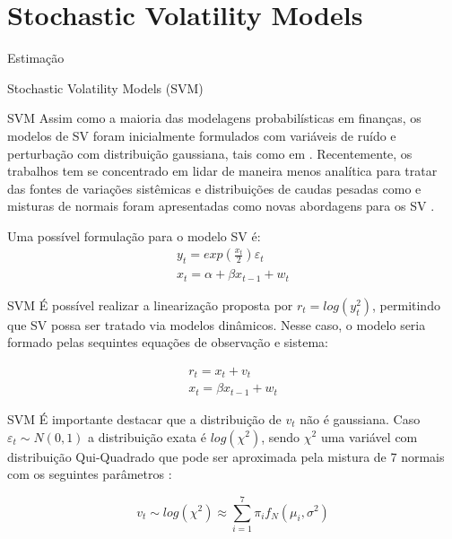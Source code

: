 \documentclass{beamer}
\begin{document}
\section{Stochastic Volatility Models}
\begin{frame}{Estimação}
    \begin{block}{ }
      \Huge  Stochastic Volatility Models (SVM)
    \end{block}
\end{frame}





\begin{frame}{SVM}
Assim como a maioria das modelagens probabilísticas em finanças, os modelos de SV foram inicialmente formulados com variáveis de ruído e perturbação com distribuição gaussiana, tais como em \cite{HULL1987}. Recentemente, os trabalhos tem se concentrado em lidar de maneira menos analítica para tratar das fontes de variações sistêmicas e distribuições de caudas pesadas como e misturas de normais foram apresentadas como novas abordagens para os SV \citep{Virbickaite2016}.

Uma possível formulação para o modelo SV é:
\begin{eqnarray}
y_t = exp\left(\frac{x_t}{2}\right)\varepsilon_t \nonumber \\
x_t = \alpha +  \beta x_{t-1} + w_t
\end{eqnarray}


\end{frame}


\begin{frame}{SVM}
É possível realizar a linearização proposta por \cite{Kim1998} $r_t = log(y_t^2)$, permitindo que SV possa ser tratado via modelos dinâmicos. Nesse caso, o modelo seria formado pelas sequintes equações de observação e sistema:

\begin{eqnarray}
r_t = x_t + v_t  \nonumber \\
x_t = \beta x_{t-1} + w_t
\label{eq:svm_basico}
\end{eqnarray}



\end{frame}



\begin{frame}{SVM}
É importante destacar que a distribuição de $v_t$ não é gaussiana. Caso $\varepsilon_t \sim N(0,1)$ a distribuição exata é $log(\chi^2)$, sendo $\chi^2$ uma variável com distribuição Qui-Quadrado que pode ser aproximada pela mistura de 7 normais com os seguintes parâmetros \citep{Kim1998}:

\begin{equation}
v_t \sim log(\chi^2) \approx \sum_{i=1}^7 \pi_i f_N(\mu_i,\sigma^2)
\label{eq:mixnormal}
\end{equation}

\end{frame}
\end{document}
